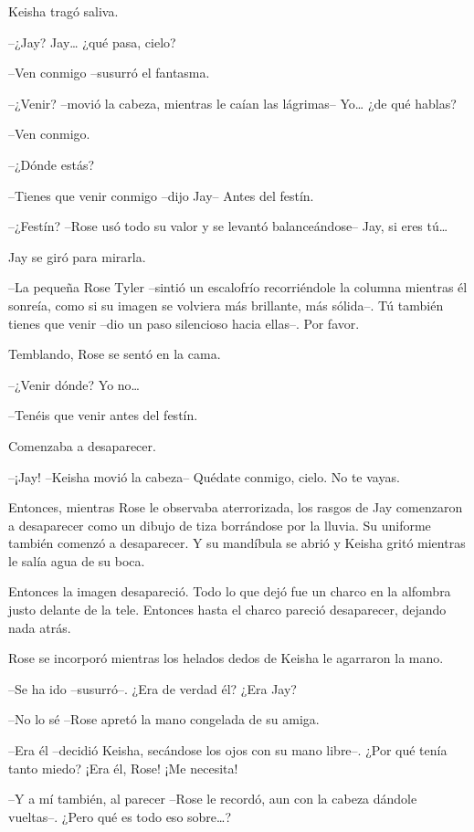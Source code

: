 {Keisha tragó saliva.}

{--¿Jay? Jay\ldots{} ¿qué pasa, cielo?}

{--Ven conmigo --susurró el fantasma.}

{--¿Venir? --movió la cabeza, mientras le caían las lágrimas--
 Yo\ldots{} ¿de qué hablas?}

{--Ven conmigo.}

{--¿Dónde estás?}

{--Tienes que venir conmigo --dijo Jay-- Antes del festín.}

{--¿Festín? --Rose usó todo su valor y se levantó balanceándose-- Jay,
 si eres tú\ldots{}}

{Jay se giró para mirarla.}

{--La pequeña Rose Tyler --sintió un escalofrío recorriéndole la columna
 mientras él sonreía, como si su imagen se volviera más brillante, más
 sólida--. Tú también tienes que venir --dio un paso silencioso hacia
ellas--. Por favor.}

{Temblando, Rose se sentó en la cama.}

{--¿Venir dónde? Yo no\ldots{}}

{--Tenéis que venir antes del festín.}

{Comenzaba a desaparecer.}

{--¡Jay! --Keisha movió la cabeza-- Quédate conmigo, cielo. No te
vayas.}

{Entonces, mientras Rose le observaba aterrorizada, los rasgos de Jay
 comenzaron a desaparecer como un dibujo de tiza borrándose por la
 lluvia. Su uniforme también comenzó a desaparecer. Y su mandíbula se
abrió y Keisha gritó mientras le salía agua de su boca.}

{Entonces la imagen desapareció. Todo lo que dejó fue un charco en la
 alfombra justo delante de la tele. Entonces hasta el charco pareció
desaparecer, dejando nada atrás.}

{Rose se incorporó mientras los helados dedos de Keisha le agarraron la
mano.}

{--Se ha ido --susurró--. ¿Era de verdad él? ¿Era Jay?}

{--No lo sé --Rose apretó la mano congelada de su amiga.}

{--Era él --decidió Keisha, secándose los ojos con su mano libre--. ¿Por
qué tenía tanto miedo? ¡Era él, Rose! ¡Me necesita!}

{--Y a mí también, al parecer --Rose le recordó, aun con la cabeza
 dándole vueltas--. ¿Pero qué es todo eso sobre\ldots{}?}

